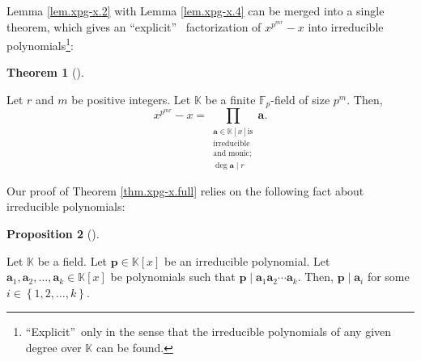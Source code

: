 \documentclass[numbers=enddot,12pt,final,onecolumn,notitlepage]{scrartcl}%
\theoremstyle{definition}
\newtheorem{theo}{Theorem}[subsection]
\newenvironment{theorem}[1][]
{\begin{theo}[#1]\begin{leftbar}}
{\end{leftbar}\end{theo}}
\newtheorem{prop}[theo]{Proposition}
\newenvironment{proposition}[1][]
{\begin{prop}[#1]\begin{leftbar}}
{\end{leftbar}\end{prop}}
\let\prodnonlimits\prod
\renewcommand{\prod}{\prodnonlimits\limits}
\begin{document}
Lemma \ref{lem.xpg-x.2} with Lemma \ref{lem.xpg-x.4} can be merged into a
single theorem, which gives an \textquotedblleft explicit\textquotedblright%
\ factorization of $x^{p^{mr}}-x$ into irreducible
polynomials\footnote{\textquotedblleft Explicit\textquotedblright\ only in the
sense that the irreducible polynomials of any given degree over $\mathbb{K}$
can be found.}:

\begin{theorem}
\label{thm.xpg-x.full}Let $r$ and $m$ be positive integers. Let $\mathbb{K}$
be a finite $\mathbb{F}_{p}$-field of size $p^{m}$. Then,%
\[
x^{p^{mr}}-x=\prod_{\substack{\mathbf{a}\in\mathbb{K}\left[  x\right]  \text{
is}\\\text{irreducible}\\\text{and monic;}\\\deg\mathbf{a}\mid r}}\mathbf{a}.
\]

\end{theorem}

Our proof of Theorem \ref{thm.xpg-x.full} relies on the following fact about
irreducible polynomials:

\begin{proposition}
\label{prop.irredpol.pabk}Let $\mathbb{K}$ be a field. Let $\mathbf{p}%
\in\mathbb{K}\left[  x\right]  $ be an irreducible polynomial. Let
$\mathbf{a}_{1},\mathbf{a}_{2},\ldots,\mathbf{a}_{k}\in\mathbb{K}\left[
x\right]  $ be polynomials such that $\mathbf{p}\mid\mathbf{a}_{1}%
\mathbf{a}_{2}\mathbf{\cdots a}_{k}$. Then, $\mathbf{p}\mid\mathbf{a}_{i}$ for
some $i\in\left\{  1,2,\ldots,k\right\}  $.
\end{proposition}
\end{document}
